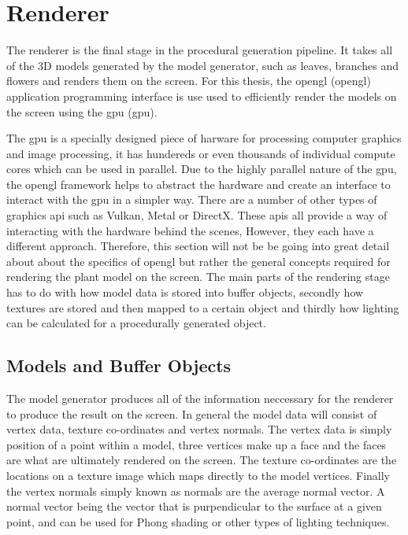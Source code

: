 \section{Renderer}

\noindent
The renderer is the final stage in the procedural generation pipeline. It takes all of the 3D models generated by the model generator, such as leaves, branches and flowers and renders them on the screen.  For this thesis, the \acrlong{opengl} (\acrshort{opengl}) application programming interface is use used to efficiently render the models on the screen using the \acrlong{gpu} (\acrshort{gpu}). 

The \acrshort{gpu} is a specially designed piece of harware for processing computer graphics and image processing, it has hundereds or even thousands of individual compute cores which can be used in parallel. Due to the highly parallel nature of the \acrshort{gpu}, the \acrshort{opengl} framework helps to abstract the hardware and create an interface to interact with the \acrshort{gpu} in a simpler way. There are a number of other types of graphics \acrshort{api} such as Vulkan, Metal or DirectX. These \acrshort{api}s all provide a way of interacting with the hardware behind the scenes, However, they each have a different approach. Therefore, this section will not be be going into great detail about about the specifics of \acrshort{opengl} but rather the general concepts required for rendering the plant model on the screen. The main parts of the rendering stage has to do with how model data is stored into buffer objects, secondly how textures are stored and then mapped to a certain object and thirdly how lighting can be calculated for a procedurally generated object.

\subsection{Models and Buffer Objects}

The model generator produces all of the information neccessary for the renderer to produce the result on the screen. In general the model data will consist of vertex data, texture co-ordinates and vertex normals. The vertex data is simply position of a point within a model, three vertices make up a face and the faces are what are ultimately rendered on the screen. The texture co-ordinates are the locations on a texture image which maps directly to the model vertices. Finally the vertex normals simply known as normals are the average normal vector. A normal vector being the vector that is purpendicular to the surface at a given point, and can be used for Phong shading or other types of lighting techniques.  

